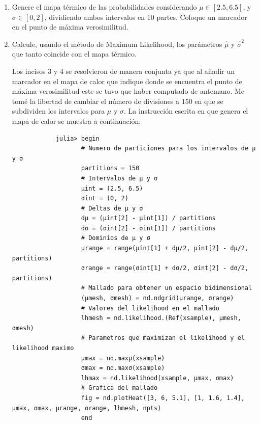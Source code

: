 \begin{enumerate}
\begin{solution}
    \end{solution}
    \item Genere el mapa térmico de las probabilidades considerando $\mu \in \left[2.5, 6.5\right]$, y $\sigma \in \left[0, 2\right]$, dividiendo ambos intervalos en 10 partes. Coloque un marcador en el punto de máxima verosimilitud.
    \item Calcule, usando el método de Maximum Likelihood, los parámetros $\hat{\mu}$ y $\hat{\sigma}^2$ que tanto coincide con el mapa térmico.
    \begin{solution}
        Los incisos 3 y 4 se resolvieron de manera conjunta ya que al añadir un marcador en el mapa de calor que indique donde se encuentra el punto de máxima verosimilitud este se tuvo que haber computado de antemano. Me tomé la libertad de cambiar el número de divisiones a 150 en que se subdividen los intervalos para $\mu$ y $\sigma$. La instrucción escrita en  que genera el mapa de calor se muestra a continuación:
        \begin{verbatim}
            julia> begin 
                   # Numero de particiones para los intervalos de μ y σ
                   partitions = 150
                   # Intervalos de μ y σ
                   μint = (2.5, 6.5)
                   σint = (0, 2)
                   # Deltas de μ y σ
                   dμ = (μint[2] - μint[1]) / partitions
                   dσ = (σint[2] - σint[1]) / partitions
                   # Dominios de μ y σ
                   μrange = range(μint[1] + dμ/2, μint[2] - dμ/2, partitions)
                   σrange = range(σint[1] + dσ/2, σint[2] - dσ/2, partitions)
                   # Mallado para obtener un espacio bidimensional
                   (μmesh, σmesh) = nd.ndgrid(μrange, σrange)
                   # Valores del likelihood en el mallado
                   lhmesh = nd.likelihood.(Ref(xsample), μmesh, σmesh)
                   # Parametros que maximizan el likelihood y el likelihood maximo
                   μmax = nd.maxμ(xsample)
                   σmax = nd.maxσ(xsample)
                   lhmax = nd.likelihood(xsample, μmax, σmax)
                   # Grafica del mallado
                   fig = nd.plotHeat([3, 6, 5.1], [1, 1.6, 1.4], μmax, σmax, μrange, σrange, lhmesh, npts)
                   end

\end{verbatim}
\end{solution}
\end{enumerate}
